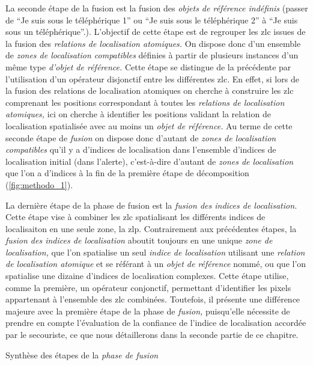 La seconde étape de la fusion est la fusion des \emph{objets de
  référence indéfinis} (\eg passer de \enquote{Je suis sous le
  téléphérique 1} ou \enquote{Je suis sous le téléphérique 2} à
\enquote{Je suis sous un téléphérique}.). L'objectif de cette étape
est de regrouper les \ac{zlc} issues de la fusion des \emph{relations
  de localisation atomiques.} On dispose donc d'un ensemble de
\emph{zones de localisation compatibles} définies à partir de
plusieurs instances d'un même type \emph{d'objet de référence.} Cette
étape se distingue de la précédente par l'utilisation d'un opérateur
disjonctif entre les différentes \ac{zlc}. En effet, si lors de la
fusion des relations de localisation atomiques on cherche à construire
les \ac{zlc} comprenant les positions correspondant à toutes les
\emph{relations de localisation atomiques,} ici on cherche à
identifier les positions validant la relation de localisation
spatialisée avec au moins un \emph{objet de référence.}
%
Au terme de cette seconde étape de \emph{fusion} on dispose donc
d'autant de \emph{zones de localisation compatibles} qu'il y a
d'indices de localisation dans l'ensemble d'indices de localisation
initial (\ie dans l'alerte), c'est-à-dire d'autant de \emph{zones de
  localisation} que l'on a d'indices à la fin de la première étape de
décomposition (\autoref{fig:methodo_1}).

La dernière étape de la phase de fusion est la \emph{fusion des
  indices de localisation.} Cette étape vise à combiner les \ac{zlc}
spatialisant les différents indices de localisaiton en une seule zone,
la \ac{zlp}. Contrairement aux précédentes étapes, la \emph{fusion des
  indices de localisation} aboutit toujours en une unique \emph{zone
  de localisation,} que l'on spatialise un seul \emph{indice de
  localisation} utilisant une \emph{relation de localisation atomique}
et se référant à un \emph{objet de référence} nommé, ou que l'on
spatialise une dizaine d'indices de localisation complexes. Cette
étape utilise, comme la première, un opérateur conjonctif, permettant
d'identifier les pixels appartenant à l'ensemble des \ac{zlc}
combinées. Toutefois, il présente une différence majeure avec la
première étape de la phase de \emph{fusion,} puisqu'elle nécessite de
prendre en compte l'évaluation de la confiance de l'indice de
localisation accordée par le secouriste, ce que nous détaillerons dans
la seconde partie de ce chapitre.

\begin{table}
  \centering
   
   \caption{Synthèse des étapes de la \emph{phase de fusion}}
  \label{tab:comparaison_etapes_fusion}
\end{table}

